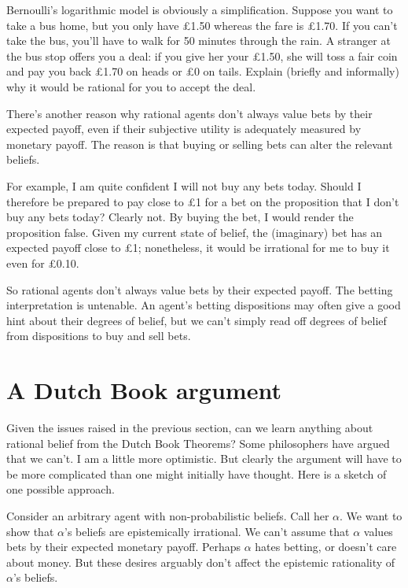 \begin{exercise1}
  Bernoulli's logarithmic model is obviously a simplification. Suppose
  you want to take a bus home, but you only have £1.50 whereas the
  fare is £1.70. If you can't take the bus, you'll have to walk for 50
  minutes through the rain. A stranger at the bus stop offers you a
  deal: if you give her your £1.50, she will toss a fair coin and pay
  you back £1.70 on heads or £0 on tails. Explain (briefly and
  informally) why it would be rational for you to accept the deal.
\end{exercise1}

There's another reason why rational agents don't always value bets by
their expected payoff, even if their subjective utility is adequately
measured by monetary payoff. The reason is that buying or selling bets
can alter the relevant beliefs. 

For example, I am quite confident I will not buy any bets
today. Should I therefore be prepared to pay close to £1 for a bet on
the proposition that I don't buy any bets today? Clearly not. By
buying the bet, I would render the proposition false. Given my current
state of belief, the (imaginary) bet has an expected payoff close to
£1; nonetheless, it would be irrational for me to buy it even for £0.10.

So rational agents don't always value bets by their expected
payoff. The betting interpretation is untenable. An agent's betting
dispositions may often give a good hint about their degrees of belief,
but we can't simply read off degrees of belief from dispositions to
buy and sell bets.

\section{A Dutch Book argument}


Given the issues raised in the previous section, can we learn anything
about rational belief from the Dutch Book Theorems? Some philosophers
have argued that we can't. I am a little more optimistic. But clearly
the argument will have to be more complicated than one might initially
have thought. Here is a sketch of one possible approach.

Consider an arbitrary agent with non-probabilistic beliefs. Call her
$\alpha$. We want to show that $\alpha$'s beliefs are epistemically
irrational. We can't assume that $\alpha$ values bets by their
expected monetary payoff. Perhaps $\alpha$ hates betting, or doesn't
care about money. But these desires arguably don't affect the
epistemic rationality of $\alpha$'s beliefs. 

